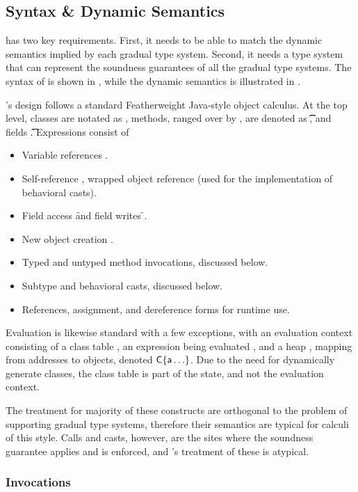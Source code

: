 \documentclass[USenglish]{tex/lipics-v2016}
\begin{document}
\subsection{Syntax \& Dynamic Semantics}

\kafka has two key requirements. First, it needs to be able to match the
dynamic semantics implied by each gradual type system. Second, it needs a
type system that can represent the soundness guarantees of all the gradual type systems. 
The syntax of \kafka is shown in , while the
dynamic semantics is illustrated in .

\kafka's design follows a standard Featherweight Java-style object calculus.
At the top level, classes are notated as \Class{},
methods, ranged over by \md, are denoted as \Mdef\m\x\t\t\e, and fields
\Fdef\f\t. Expressions consist of

\begin{itemize}
\item Variable references \x.
\item Self-reference \this, wrapped object reference \that (used for the implementation of behavioral casts).
\item Field access \FRead\f and field writes \FWrite\f\e.
\item New object creation \New{}.
\item Typed and untyped method invocations, discussed below.
\item Subtype and behavioral casts, discussed below.
\item References, assignment, and dereference forms for runtime use.
\end{itemize}

Evaluation is likewise standard with a few exceptions, with an evaluation
context consisting of a class table \K, an expression being evaluated \e, and
a heap \s, mapping from addresses \a to objects, denoted $\C\{\a\ldots\}$. Due
to the need for dynamically generate classes, the class table \K is part of
the state, and not the evaluation context.

The treatment for majority of these constructs are orthogonal to the problem of supporting
gradual type systems, therefore their semantics are typical for calculi of this style. 
Calls and casts, however, are the sites where the soundness guarantee applies and is enforced, and
\kafka's treatment of these is atypical.

\subsubsection{Invocations}
\end{document}
